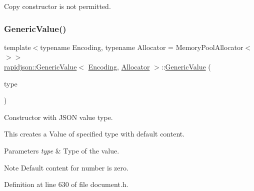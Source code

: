 Copy constructor is not permitted. 

\mbox{\label{classrapidjson_1_1_generic_value_a646b6d4d3d98799a0926d96ffa127a58}} 
\subsubsection{\texorpdfstring{GenericValue()}{GenericValue()}\hspace{0.1cm}{\footnotesize\ttfamily [3/17]}}
{\footnotesize\ttfamily template$<$typename Encoding, typename Allocator = Memory\+Pool\+Allocator$<$$>$$>$ \\
\mbox{\hyperlink{classrapidjson_1_1_generic_value}{rapidjson\+::\+Generic\+Value}}$<$ \mbox{\hyperlink{classrapidjson_1_1_encoding}{Encoding}}, \mbox{\hyperlink{classrapidjson_1_1_allocator}{Allocator}} $>$\+::\mbox{\hyperlink{classrapidjson_1_1_generic_value}{Generic\+Value}} (\begin{DoxyParamCaption}\item[{\mbox{\hyperlink{namespacerapidjson_ae79a4751c1c460ff0de5ecc07874f3e4}{Type}}}]{type }\end{DoxyParamCaption})\hspace{0.3cm}{\ttfamily [explicit]}}



Constructor with J\+S\+ON value type. 

This creates a Value of specified type with default content. 
\begin{DoxyParams}{Parameters}
{\em type} & Type of the value. \\
\hline
\end{DoxyParams}
\begin{DoxyNote}{Note}
Default content for number is zero. 
\end{DoxyNote}


Definition at line 630 of file document.\+h.


